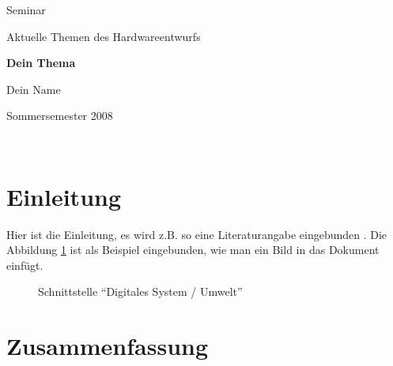 \documentclass[11pt]{article}
\begin{document}
\begin{center}
\end{center}

\vspace{0.6cm}
\begin{center}
\begin{LARGE}Seminar \\ \end{LARGE}
\vspace{0.2cm}
\begin{LARGE}Aktuelle Themen des Hardwareentwurfs \\ \end{LARGE}
\vspace{2.9cm}
\begin{LARGE}\textbf{Dein Thema }\\ \end{LARGE}
\vspace{2.9cm}
\begin{LARGE}Dein Name \\ \end{LARGE}
\vspace{10.2cm}
\begin{large}Sommersemester 2008\\ \end{large}


\end{center}
\vspace{0.4cm}\ \\
\newpage
\tableofcontents
\newpage

\section{Einleitung}
Hier ist die Einleitung, es wird z.B. so eine Literaturangabe eingebunden \cite{halbleiter}. Die Abbildung \ref{pic_einfuehrung} ist als Beispiel eingebunden, wie man ein Bild in das Dokument einfügt.
\begin{figure}[htb]
	\begin{center}
		\caption{Schnittstelle "`Digitales System / Umwelt"'}
	\label{pic_einfuehrung}
	\end{center}
\end{figure}

\section{Zusammenfassung}






\end{document}

